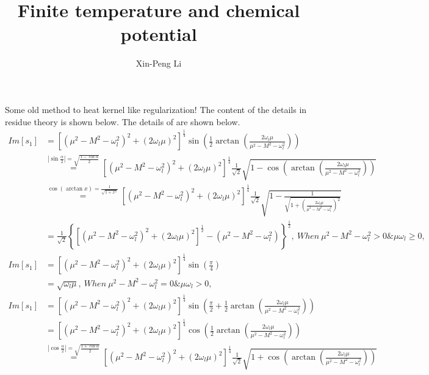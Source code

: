 \documentclass{article}
\title{Finite temperature and chemical potential}
\author{Xin-Peng Li}
\begin{document}
\maketitle
Some old method to heat kernel like regularization!
The content of the details in residue theory is shown below.
The details of are shown below.
\begin{equation}\label{equation1s}
    \begin{split}
        Im\left[s_1\right]&=\left[\left(\mu^2-M^2-\omega_l^2\right)^2+\left(2\omega_l\mu\right)^2\right]^{\frac{1}{4}}\sin\left(\frac{1}{2}\arctan\left(\frac{2\omega_l\mu}{\mu^2-M^2-\omega_l^2}\right)\right)
        \\&\stackrel{|\sin\frac{\alpha}{2}|=\sqrt{\frac{1-\cos\alpha}{2}}}{=}\left[\left(\mu^2-M^2-\omega_l^2\right)^2+\left(2\omega_l\mu\right)^2\right]^{\frac{1}{4}}\frac{1}{\sqrt{2}}\sqrt{1-\cos\left(\arctan\left(\frac{2\omega_l\mu}{\mu^2-M^2-\omega_l^2}\right)\right)}
        \\&\stackrel{\cos\left(\arctan x\right)=\frac{1}{\sqrt{1+x^2}}}{=}
        \left[\left(\mu^2-M^2-\omega_l^2\right)^2+\left(2\omega_l\mu\right)^2\right]^{\frac{1}{4}}\frac{1}{\sqrt{2}}
        \sqrt{1-\frac{1}{\sqrt{1+\left(\frac{2\omega_l\mu}{\mu^2-M^2-\omega_l^2}\right)^2}}}
        \\&=\frac{1}{\sqrt{2}}\left\{\left[\left(\mu^2-M^2-\omega_l^2\right)^2+\left(2\omega_l\mu\right)^2\right]^{\frac{1}{2}}-\left(\mu^2-M^2-\omega_l^2\right)\right\}^{\frac{1}{2}},\ When\ \mu^2-M^2-\omega_l^2>0\&\mu\omega_l\geq 0,\\
        Im\left[s_1\right]&=\left[\left(\mu^2-M^2-\omega_l^2\right)^2+\left(2\omega_l\mu\right)^2\right]^{\frac{1}{4}}\sin\left(\frac{\pi}{4}\right)
        \\&=\sqrt{\omega_l\mu},\ When\ \mu^2-M^2-\omega_l^2=0\&\mu\omega_l> 0,\\
        Im\left[s_1\right]&=\left[\left(\mu^2-M^2-\omega_l^2\right)^2+\left(2\omega_l\mu\right)^2\right]^{\frac{1}{4}}\sin\left(\frac{\pi}{2}+\frac{1}{2}\arctan\left(\frac{2\omega_l\mu}{\mu^2-M^2-\omega_l^2}\right)\right)\\
        &=\left[\left(\mu^2-M^2-\omega_l^2\right)^2+\left(2\omega_l\mu\right)^2\right]^{\frac{1}{4}}\cos\left(\frac{1}{2}\arctan\left(\frac{2\omega_l\mu}{\mu^2-M^2-\omega_l^2}\right)\right)
        \\&\stackrel{|\cos\frac{\alpha}{2}|=\sqrt{\frac{1+\cos\alpha}{2}}}{=}\left[\left(\mu^2-M^2-\omega_l^2\right)^2+\left(2\omega_l\mu\right)^2\right]^{\frac{1}{4}}\frac{1}{\sqrt{2}}\sqrt{1+\cos\left(\arctan\left(\frac{2\omega_l\mu}{\mu^2-M^2-\omega_l^2}\right)\right)}

\end{split}
\end{equation}
\end{document}
